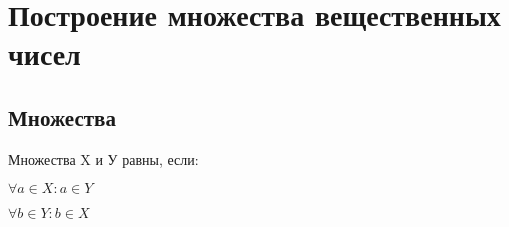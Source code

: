 

\chapter{Построение множества вещественных чисел}


\section{Множества}

\begin{definition}
    Множества X и У равны, если:

    $\forall a \in X: a \in Y$

    $\forall b \in Y: b \in X$
\end{definition}

